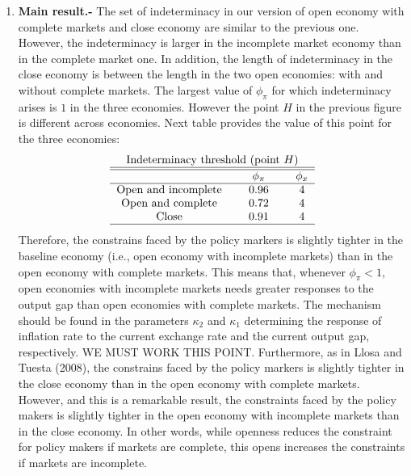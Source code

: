 \documentclass{article}
\begin{document}
\begin{enumerate}
\item \textbf{Main result.- }The set of indeterminacy in our version of open
economy with complete markets and close economy are similar to the previous
one. However, the indeterminacy is larger in the incomplete market economy
than in the complete market one. In addition, the length of indeterminacy in
the close economy is between the length in the two open economies: with and
without complete markets. The largest value of $\phi _{\pi }$ for which
indeterminacy arises is $1$ in the three economies. However the point $H$ in
the previous figure is different across economies. Next table provides the
value of this point for the three economies:%
\begin{equation*}
\begin{tabular}{lcccc}
\multicolumn{5}{c}{Indeterminacy threshold (point $H)$} \\ \hline\hline
&  & $\phi _{\pi }$ &  & $\phi _{x}$ \\ \hline
\multicolumn{1}{c}{Open and incomplete} &  & $0.96$ &  & $4$ \\ 
\multicolumn{1}{c}{Open and complete} &  & $0.72$ &  & $4$ \\ 
\multicolumn{1}{c}{Close} &  & $0.91$ &  & $4$ \\ \hline
\end{tabular}%
\end{equation*}%
Therefore, the constrains faced by the policy markers is slightly tighter in
the baseline economy (i.e., open economy with incomplete markets) than in
the open economy with complete markets. This means that, whenever $\phi
_{\pi }<1,$ open economies with incomplete markets needs greater responses
to the output gap than open economies with complete markets. The mechanism
should be found in the parameters $\kappa _{2}$ and $\kappa _{1}$
determining the response of inflation rate to the current exchange rate and
the current output gap, respectively. WE MUST WORK THIS POINT. Furthermore,
as in Llosa and Tuesta (2008), the constrains faced by the policy markers is
slightly tighter in the close economy than in the open economy with complete
markets. However, and this is a remarkable result, the constraints faced by
the policy makers is slightly tighter in the open economy with incomplete
markets than in the close economy. In other words, while openness reduces
the constraint for policy makers if markets are complete, this opens
increases the constraints if markets are incomplete.


\end{enumerate}
\end{document}
